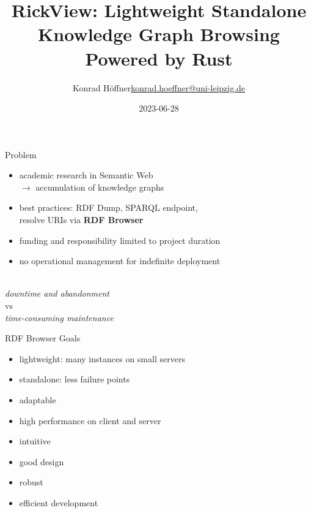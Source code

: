 \documentclass[14pt,aspectratio=169]{beamer}
\date{2023-06-28}
\author{\texorpdfstring{Konrad Höffner\newline\url{konrad.hoeffner@uni-leipzig.de}}{Konrad Höffner}}
\title{RickView: Lightweight Standalone Knowledge Graph Browsing Powered by Rust}
\subtitle{}
\begin{document}
\begin{frame}
\titlepage
\end{frame}

\begin{frame}{Problem}
\begin{itemize}
\item academic research in Semantic Web\\$\rightarrow$ accumulation of knowledge graphs
\item best practices: RDF Dump, SPARQL endpoint,\\resolve URIs via \textbf{RDF Browser}
\pause
\item funding and responsibility limited to project duration 
\item no operational management for indefinite deployment
\pause
\end{itemize}
~\\
\centering
\emph{downtime and abandonment}\\
vs\\
\emph{time-consuming maintenance}
\end{frame}

\begin{frame}{RDF Browser Goals}
\begin{itemize}
\item lightweight: many instances on small servers
\item standalone: less failure points
\item adaptable
\item high performance on client and server
\pause
\item intuitive
\item good design
\item robust
\pause
\item efficient development
\end{itemize}
\end{frame}
\end{document}
